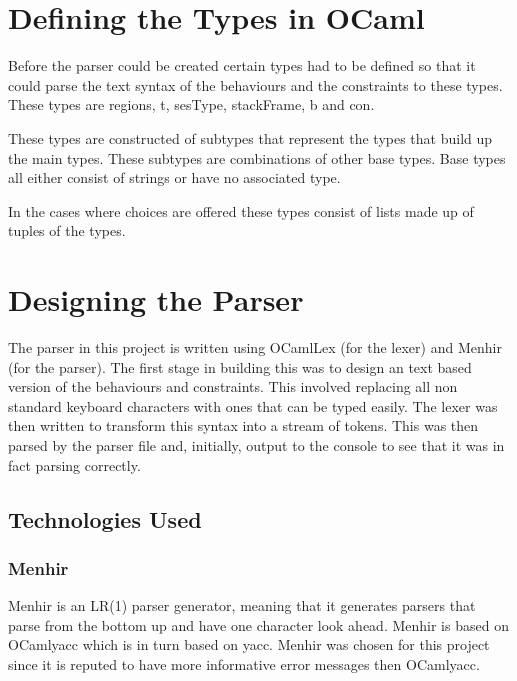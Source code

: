 \documentclass[12pt]{article}
\begin{document}
\maketitle

\section{Defining the Types in OCaml}

Before the parser could be created certain types had to be defined so that it could parse the text syntax of the behaviours and the constraints to these types. These types are regions, t, sesType, stackFrame, b and con. 

These types are constructed of subtypes that represent the types that build up the main types. These subtypes are combinations of other base types. Base types all either consist of strings or have no associated type. 

In the cases where choices are offered these types consist of lists made up of tuples of the types. 

\section {Designing the Parser}

The parser in this project is written using OCamlLex (for the lexer) and Menhir (for the parser). The first stage in building this was to design an text based version of the behaviours and constraints. This involved replacing all non standard keyboard characters with ones that can be typed easily. The lexer was then written to transform this syntax into a stream of tokens. This was then parsed by the parser file and, initially, output to the console to see that it was in fact parsing correctly. 

\subsection{Technologies Used}
\subsubsection{Menhir}
Menhir is an LR(1) parser generator, meaning that it generates parsers that parse from the bottom up and have one character look ahead. Menhir is based on OCamlyacc which is in turn based on yacc. Menhir was chosen for this project since it is reputed to have more informative error messages then OCamlyacc. 
\end{document}
